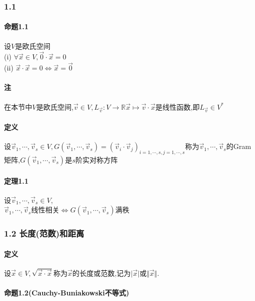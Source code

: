 \documentclass{ctexart}
\begin{document}
\fi

\subsubsection{1.1 }

\paragraph{命题1.1}
设$V$是欧氏空间\\
(i) $\forall \vec{x} \in V, \vec{0} \cdot \vec{x} = 0$\\
(ii) $\vec{x}\cdot\vec{x} = 0 \Leftrightarrow \vec{x} = \vec{0}$

\paragraph{注}
在本节中$V$是欧氏空间,$\vec{v} \in V, L_{\vec{v}}:V \rightarrow \mathbb{R} \vec{x} \mapsto \vec{v}\cdot\vec{x}$是线性函数,即$L_{\vec{v}} \in V^{*}$

\paragraph{定义}
设$\vec{v}_{1},\cdots,\vec{v}_{s} \in V,G(\vec{v}_{1},\cdots,\vec{v}_{s})=(\vec{v}_{i}\cdot \vec{v}_{j})_{i=1,\cdots,s,j=1,\cdots,s}$称为$\vec{v}_{1},\cdots,\vec{v}_{s}$的Gram矩阵,$G(\vec{v}_{1},\cdots,\vec{v}_{s})$是$s$阶实对称方阵

\paragraph{定理1.1}
设$\vec{v}_{1},\cdots,\vec{v}_{s} \in V$,\\
$\vec{v}_{1},\cdots,\vec{v}_{s}$线性相关$\Leftrightarrow G(\vec{v}_{1},\cdots,\vec{v}_{s})$满秩

\subsubsection{1.2 长度(范数)和距离}

\paragraph{定义}
设$\vec{x} \in V, \sqrt{\vec{x}\cdot\vec{x}}$称为$\vec{x}$的长度或范数,记为$\vert \vec{x} \vert$或$\Vert \vec{x} \Vert$.

\paragraph{命题1.2(Cauchy-Buniakowski不等式)}
\end{document}
